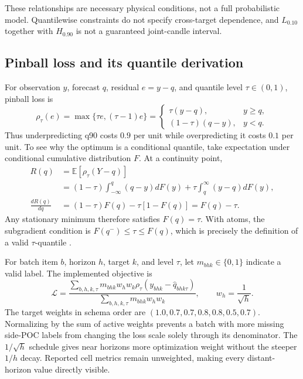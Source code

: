 \documentclass[10pt]{article}
\begin{document}
These relationships are necessary physical conditions, not a full probabilistic model. Quantilewise
constraints do not specify cross-target dependence, and $L_{0.10}$ together with $H_{0.90}$ is not a
guaranteed joint-candle interval.

\subsection{Pinball loss and its quantile derivation}

For observation $y$, forecast $q$, residual $e=y-q$, and quantile level $\tau\in(0,1)$, pinball loss is
\begin{equation}
\rho_\tau(e)=\max\{\tau e,(\tau-1)e\}
=\begin{cases}
\tau(y-q),&y\ge q,\\
(1-\tau)(q-y),&y<q.
\end{cases}
\label{eq:pinball}
\end{equation}
Thus underpredicting q90 costs $0.9$ per unit while overpredicting it costs $0.1$ per unit. To see why
the optimum is a conditional quantile, take expectation under conditional cumulative distribution
$F$. At a continuity point,
\begin{align}
R(q)&=\mathbb E[\rho_\tau(Y-q)]\\
&=(1-\tau)\int_{-\infty}^{q}(q-y)dF(y)
+\tau\int_q^\infty(y-q)dF(y),\\
\frac{dR(q)}{dq}&=(1-\tau)F(q)-\tau[1-F(q)]=F(q)-\tau.
\end{align}
Any stationary minimum therefore satisfies $F(q)=\tau$. With atoms, the subgradient condition is
$F(q^-)\le\tau\le F(q)$, which is precisely the definition of a valid $\tau$-quantile
\citep{koenker1978quantile}.

For batch item $b$, horizon $h$, target $k$, and level $\tau$, let $m_{bhk}\in\{0,1\}$ indicate a
valid label. The implemented objective is
\begin{equation}
\mathcal L=
\frac{\sum_{b,h,k,\tau}m_{bhk}w_hw_k
\rho_\tau(y_{bhk}-\widehat q_{bhk\tau})}
{\sum_{b,h,k,\tau}m_{bhk}w_hw_k},
\qquad w_h=\frac{1}{\sqrt h}.
\label{eq:weighted-loss}
\end{equation}
The target weights in schema order are
$(1.0,0.7,0.7,0.8,0.8,0.5,0.7)$. Normalizing by the sum of active weights prevents a batch with more
missing side-POC labels from changing the loss scale solely through its denominator. The $1/\sqrt h$
schedule gives near horizons more optimization weight without the steeper $1/h$ decay. Reported
cell metrics remain unweighted, making every distant-horizon value directly visible.
\end{document}
